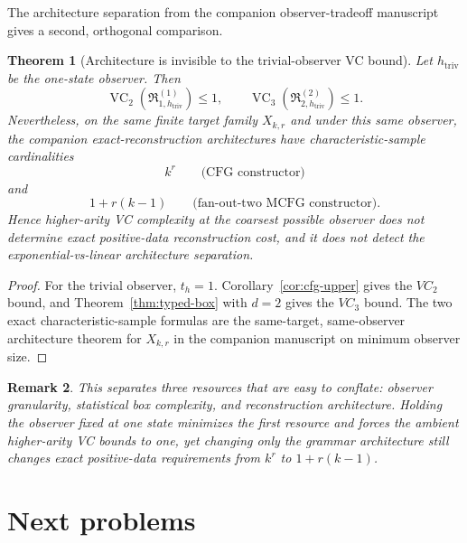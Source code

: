 \documentclass[11pt]{article}
\newtheorem{theorem}{Theorem}[section]
\newtheorem{remark}[theorem]{Remark}
\newcommand{\Rclass}{\mathfrak R}
\newcommand{\VC}{\operatorname{VC}}
\begin{document}
The architecture separation from the companion observer-tradeoff manuscript
gives a second, orthogonal comparison.

\begin{theorem}[Architecture is invisible to the trivial-observer VC bound]
\label{thm:architecture-vc}
Let \(h_{\mathrm{triv}}\) be the one-state observer. Then
\[
 \VC_2\!\left(\Rclass_{1,h_{\mathrm{triv}}}^{(1)}\right)\le1,
 \qquad
 \VC_3\!\left(\Rclass_{2,h_{\mathrm{triv}}}^{(2)}\right)\le1.
\]
Nevertheless, on the same finite target family \(X_{k,r}\) and under this
same observer, the companion exact-reconstruction architectures have
characteristic-sample cardinalities
\[
 k^r
 \qquad\text{(CFG constructor)}
\]
and
\[
 1+r(k-1)
 \qquad\text{(fan-out-two MCFG constructor)}.
\]
Hence higher-arity VC complexity at the coarsest possible observer does not
determine exact positive-data reconstruction cost, and it does not detect the
exponential-vs-linear architecture separation.
\end{theorem}

\begin{proof}
For the trivial observer, \(t_h=1\). Corollary~\ref{cor:cfg-upper} gives
the \(VC_2\) bound, and Theorem~\ref{thm:typed-box} with \(d=2\) gives the
\(VC_3\) bound. The two exact characteristic-sample formulas are the
same-target, same-observer architecture theorem for \(X_{k,r}\) in the
companion manuscript on minimum observer size.
\end{proof}

\begin{remark}
This separates three resources that are easy to conflate:
observer granularity, statistical box complexity, and reconstruction
architecture.  Holding the observer fixed at one state minimizes the first
resource and forces the ambient higher-arity VC bounds to one, yet changing
only the grammar architecture still changes exact positive-data requirements
from \(k^r\) to \(1+r(k-1)\).
\end{remark}

\section{Next problems}
\end{document}
